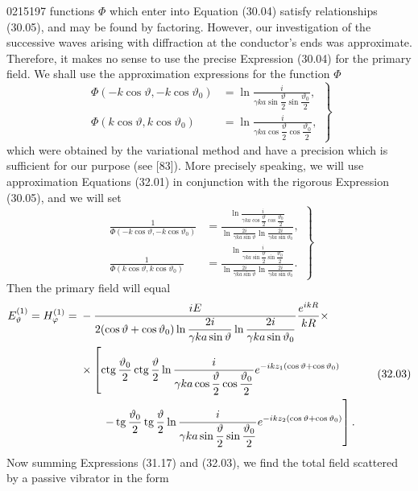 \begin{scanpage}{0215}{197}
\noindent functions $\Phi$ which enter into Equation (30.04) satisfy relationships (30.05), and may be found by factoring. However, our investigation of the successive waves arising with diffraction at the conductor's ends was approximate. Therefore, it makes no sense to use the precise Expression (30.04) for the primary field. We shall use the approximation expressions for the function $\Phi$
\[\left.\begin{aligned}
\Phi(-k\cos\vartheta,-k\cos\vartheta_0)&=\ln\frac{i}{\gamma ka\sin\dfrac\vartheta2\sin\dfrac{\vartheta_0}2},\\
\Phi(k\cos\vartheta,k\cos\vartheta_0)&=\ln\frac{i}{\gamma ka\cos\dfrac\vartheta2\cos\dfrac{\vartheta_0}2},
\end{aligned}\right\}\tag{32.01}\]
which were obtained by the variational method and have a precision which is sufficient for our purpose (see [83]). More precisely speaking, we will use approximation Equations (32.01) in conjunction with the rigorous Expression (30.05), and we will set
\[\left.\begin{aligned}
\frac1{\Phi(-k\cos\vartheta,-k\cos\vartheta_0)}&=\frac{\displaystyle\ln\frac{i}{\gamma ka\cos\dfrac\vartheta2\cos\dfrac{\vartheta_0}2}}{\displaystyle\ln\frac{2i}{\gamma ka\sin\vartheta}\ln\frac{2i}{\gamma ka\sin\vartheta_0}},\\
\frac1{\Phi(k\cos\vartheta,k\cos\vartheta_0)}&=\frac{\displaystyle\ln\frac{i}{\gamma ka\sin\dfrac\vartheta2\sin\dfrac{\vartheta_0}2}}{\displaystyle\ln\frac{2i}{\gamma ka\sin\vartheta}\ln\frac{2i}{\gamma ka\sin\vartheta_0}}.
\end{aligned}\right\}\tag{32.02}\]
Then the primary field will equal
\[\begin{aligned}
E_\vartheta^{(1)}=H_\varphi^{(1)}={}&-\frac{iE}{2(\cos\vartheta+\cos\vartheta_0)\ln\dfrac{2i}{\gamma ka\sin\vartheta}\ln\dfrac{2i}{\gamma ka\sin\vartheta_0}}\frac{e^{ikR}}{kR}\times\\
&\times\left[\operatorname{ctg}\frac{\vartheta_0}2\operatorname{ctg}\frac\vartheta2\ln\frac{i}{\gamma ka\cos\dfrac\vartheta2\cos\dfrac{\vartheta_0}2}e^{-ikz_1(\cos\vartheta+\cos\vartheta_0)}\right.\\
&\qquad\left.-\operatorname{tg}\frac{\vartheta_0}2\operatorname{tg}\frac\vartheta2\ln\frac{i}{\gamma ka\sin\dfrac\vartheta2\sin\dfrac{\vartheta_0}2}e^{-ikz_2(\cos\vartheta+\cos\vartheta_0)}\right].
\end{aligned}\tag{32.03}\]
Now summing Expressions (31.17) and (32.03), we find the total field scattered by a passive vibrator in the form
\end{scanpage}
